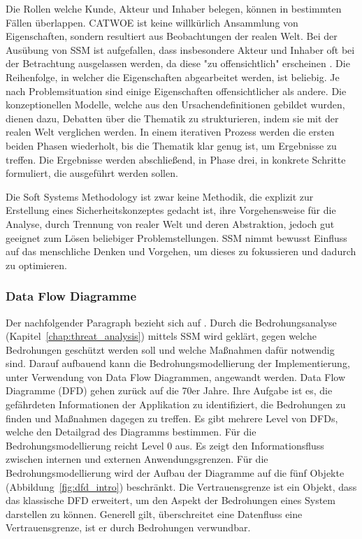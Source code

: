 \documentclass[11pt,a4paper]{report}
\begin{document}
Die Rollen welche Kunde, Akteur und Inhaber belegen, können in bestimmten Fällen überlappen. CATWOE ist keine willkürlich Ansammlung von Eigenschaften, sondern resultiert aus Beobachtungen der realen Welt. Bei der Ausübung von SSM ist aufgefallen, dass insbesondere Akteur und Inhaber oft bei der Betrachtung ausgelassen werden, da diese "zu offensichtlich" erscheinen \cite[s.~255]{gutmann}. Die Reihenfolge, in welcher die Eigenschaften abgearbeitet werden, ist beliebig. Je nach Problemsituation sind einige Eigenschaften offensichtlicher als andere. Die konzeptionellen Modelle, welche aus den Ursachendefinitionen gebildet wurden, dienen dazu, Debatten über die Thematik zu strukturieren, indem sie mit der realen Welt verglichen werden. In einem iterativen Prozess werden die ersten beiden Phasen wiederholt, bis die Thematik klar genug ist, um Ergebnisse zu treffen. Die Ergebnisse werden abschließend, in Phase drei, in konkrete Schritte formuliert, die ausgeführt werden sollen.

Die Soft Systems Methodology ist zwar keine Methodik, die explizit zur Erstellung eines Sicherheitskonzeptes gedacht ist, ihre Vorgehensweise für die Analyse, durch Trennung von realer Welt und deren Abstraktion, jedoch gut geeignet zum Lösen beliebiger Problemstellungen. SSM nimmt bewusst Einfluss auf das menschliche Denken und Vorgehen, um dieses zu fokussieren und dadurch zu optimieren.

\subsubsection{Data Flow Diagramme}

Der nachfolgender Paragraph bezieht sich auf \cite[s.~263]{gutmann}.
Durch die Bedrohungsanalyse (Kapitel~\ref{chap:threat_analysis}) mittels SSM wird geklärt, gegen welche Bedrohungen geschützt werden soll und welche Maßnahmen dafür notwendig sind. Darauf aufbauend kann die Bedrohungsmodellierung der Implementierung, unter Verwendung von Data Flow Diagrammen, angewandt werden. Data Flow Diagramme (DFD) gehen zurück auf die 70er Jahre. Ihre Aufgabe ist es, die gefährdeten Informationen der Applikation zu identifiziert, die Bedrohungen zu finden und Maßnahmen dagegen zu treffen. Es gibt mehrere Level von DFDs, welche den Detailgrad des Diagramms bestimmen. Für die Bedrohungsmodellierung reicht Level 0 aus. Es zeigt den Informationsfluss zwischen internen und externen Anwendungsgrenzen. Für die Bedrohungsmodellierung wird der Aufbau der Diagramme auf die fünf Objekte (Abbildung~\ref{fig:dfd_intro}) beschränkt. Die Vertrauensgrenze ist ein Objekt, dass das klassische DFD erweitert, um den Aspekt der Bedrohungen eines System darstellen zu können. Generell gilt, überschreitet eine Datenfluss eine Vertrauensgrenze, ist er durch Bedrohungen verwundbar.
\end{document}
